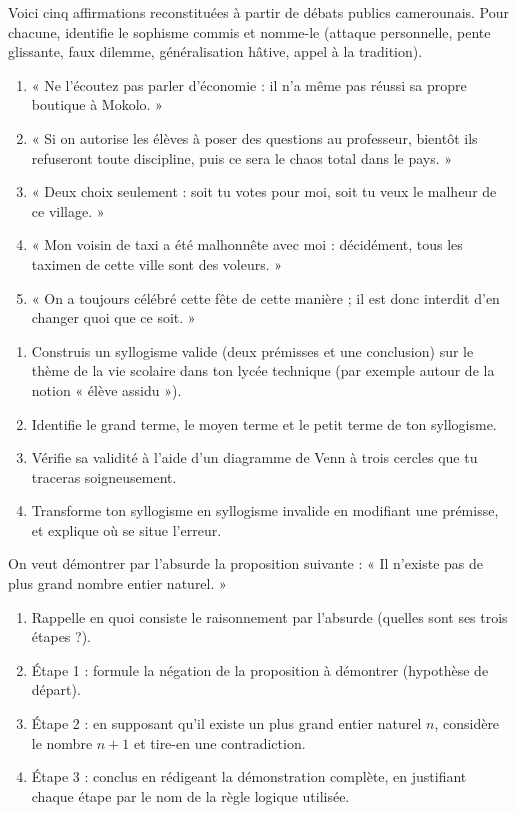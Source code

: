 \documentclass[11pt]{article}
\begin{document}
\begin{exercice}
Voici cinq affirmations reconstituées à partir de débats publics camerounais. Pour chacune, identifie le sophisme commis et nomme-le (attaque personnelle, pente glissante, faux dilemme, généralisation hâtive, appel à la tradition).
\begin{enumerate}
\item « Ne l'écoutez pas parler d'économie : il n'a même pas réussi sa propre boutique à Mokolo. »
\item « Si on autorise les élèves à poser des questions au professeur, bientôt ils refuseront toute discipline, puis ce sera le chaos total dans le pays. »
\item « Deux choix seulement : soit tu votes pour moi, soit tu veux le malheur de ce village. »
\item « Mon voisin de taxi a été malhonnête avec moi : décidément, tous les taximen de cette ville sont des voleurs. »
\item « On a toujours célébré cette fête de cette manière ; il est donc interdit d'en changer quoi que ce soit. »
\end{enumerate}
\end{exercice}

\begin{exercice}
\begin{enumerate}
\item Construis un syllogisme valide (deux prémisses et une conclusion) sur le thème de la vie scolaire dans ton lycée technique (par exemple autour de la notion « élève assidu »).
\item Identifie le grand terme, le moyen terme et le petit terme de ton syllogisme.
\item Vérifie sa validité à l'aide d'un diagramme de Venn à trois cercles que tu traceras soigneusement.
\item Transforme ton syllogisme en syllogisme invalide en modifiant une prémisse, et explique où se situe l'erreur.
\end{enumerate}
\end{exercice}

\begin{exercice}
On veut démontrer par l'absurde la proposition suivante : « Il n'existe pas de plus grand nombre entier naturel. »
\begin{enumerate}
\item Rappelle en quoi consiste le raisonnement par l'absurde (quelles sont ses trois étapes ?).
\item Étape 1 : formule la négation de la proposition à démontrer (hypothèse de départ).
\item Étape 2 : en supposant qu'il existe un plus grand entier naturel $n$, considère le nombre $n+1$ et tire-en une contradiction.
\item Étape 3 : conclus en rédigeant la démonstration complète, en justifiant chaque étape par le nom de la règle logique utilisée.
\end{enumerate}
\end{exercice}
\end{document}
